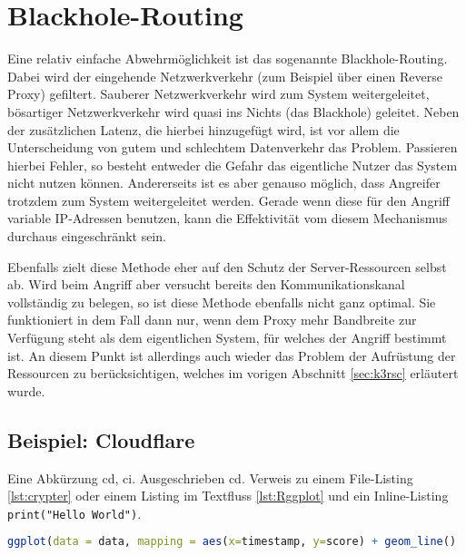 \section{Blackhole-Routing}
Eine relativ einfache Abwehrmöglichkeit ist das sogenannte Blackhole-Routing. Dabei wird der eingehende Netzwerkverkehr (zum Beispiel über einen Reverse Proxy) gefiltert. \glqq Sauberer\grqq{} Netzwerkverkehr wird zum System weitergeleitet, bösartiger Netzwerkverkehr wird quasi ins Nichts (das Blackhole) geleitet. Neben der zusätzlichen Latenz, die hierbei hinzugefügt wird, ist vor allem die Unterscheidung von gutem und schlechtem Datenverkehr das Problem. Passieren hierbei Fehler, so besteht entweder die Gefahr das eigentliche Nutzer das System nicht nutzen können. Andererseits ist es aber genauso möglich, dass Angreifer trotzdem zum System weitergeleitet werden. Gerade wenn diese für den Angriff variable IP-Adressen benutzen, kann die Effektivität vom diesem Mechanismus durchaus eingeschränkt sein. \cite{CloudflareBlackhole}

Ebenfalls zielt diese Methode eher auf den Schutz der Server-Ressourcen selbst ab. Wird beim Angriff aber versucht bereits den Kommunikationskanal vollständig zu belegen, so ist diese Methode ebenfalls nicht ganz optimal. Sie funktioniert in dem Fall dann nur, wenn dem Proxy mehr Bandbreite zur Verfügung steht als dem eigentlichen System, für welches der Angriff bestimmt ist. An diesem Punkt ist allerdings auch wieder das Problem der Aufrüstung der Ressourcen zu berücksichtigen, welches im vorigen Abschnitt \ref{sec:k3rsc} erläutert wurde.

\subsection{Beispiel: Cloudflare}
Eine Abkürzung \ac{cd}, \ac{ci}. Ausgeschrieben \acl{cd}. Verweis zu einem File-Listing \ref{lst:crypter} oder einem Listing im Textfluss \ref{lst:Rggplot} und ein Inline-Listing \lstinline|print("Hello World")|.



\begin{lstlisting}[language=R,caption=Beispielaufruf ldply-Funktion in R, label=lst:Rggplot]
ggplot(data = data, mapping = aes(x=timestamp, y=score) + geom_line()
\end{lstlisting}
